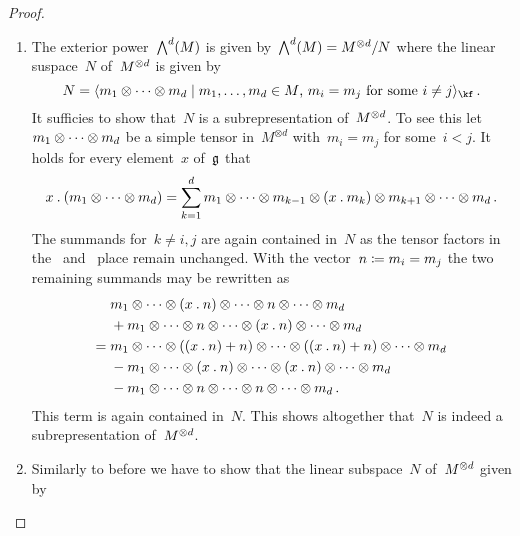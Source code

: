 \begin{proof}
  \leavevmode
  \begin{enumerate}
    \item
      The exterior power~$\operatorname{\bigwedge}^d(M)$ is given by~$\operatorname{\bigwedge}^d(M) = M^{\otimes d} / N$ where the linear suspace~$N$ of~$M^{\otimes d}$ is given by
      \[
        N
        =
        \gen{
          m_1 \tensor \dotsb \tensor m_d
        \suchthat
          \text{$m_1, \dotsc, m_d \in M$,~$m_i = m_j$ for some~$i \neq j$}
        }_{\kf} \,.
      \]
      It sufficies to show that~$N$ is a subrepresentation of~$M^{\otimes d}$.
      To see this let~$m_1 \otimes \dotsb \otimes m_d$ be a simple tensor in~$M^{\otimes d}$ with~$m_i = m_j$ for some~$i < j$.
      It holds for every element~$x$ of~$\mathfrak{g}$ that
      \[
        x \mathbin{.} (m_1 \otimes \dotsb \otimes m_d)
        =
        \sum_{k=1}^d m_1
        \otimes \dotsb \otimes m_{k-1}
        \otimes (x \mathbin{.} m_k)
        \otimes m_{k+1} \otimes \dotsb \otimes m_d  \,.
      \]
      The summands for~$k \neq i,j$ are again contained in~$N$ as the tensor factors in the~{} and~{} place remain unchanged.
      With the vector~$n \coloneqq m_i = m_j$ the two remaining summands may be rewritten as
      \begin{align*}
        {}&
          m_1 \otimes \dotsb
          \otimes (x \mathbin{.} n)
          \otimes \dotsb
          \otimes n
          \otimes \dotsb \otimes m_d
        \\
        {}&
        + m_1 \otimes \dotsb
          \otimes n
          \otimes \dotsb
          \otimes (x \mathbin{.} n)
          \otimes \dotsb \otimes m_d
        \\
        ={}&
          m_1 \otimes \dotsb
          \otimes ( (x \mathbin{.} n) + n )
          \otimes \dotsb
          \otimes ( (x \mathbin{.} n) + n )
          \otimes \dotsb \otimes m_d
        \\
        {}&
        - m_1 \otimes \dotsb
          \otimes (x \mathbin{.} n)
          \otimes \dotsb
          \otimes (x \mathbin{.} n)
          \otimes \dotsb \otimes m_d
        \\
        {}&
        - m_1 \otimes \dotsb
          \otimes n
          \otimes \dotsb
          \otimes n
          \otimes \dotsb \otimes m_d  \,.
      \end{align*}
      This term is again contained in~$N$.
      This shows altogether that~$N$ is indeed a subrepresentation of~$M^{\otimes d}$.
    \item
      Similarly to before we have to show that the linear subspace~$N$ of~$M^{\otimes d}$ given by

\end{enumerate}
\end{proof}

